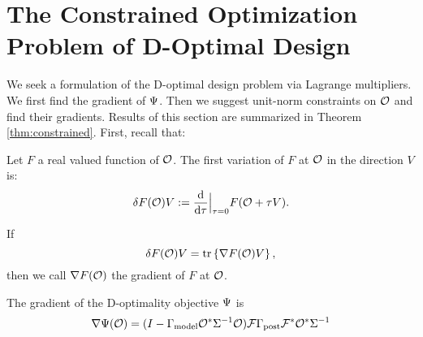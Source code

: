 \section{The Constrained Optimization Problem of D-Optimal Design}\label{section:D and grad}
We seek a formulation of the D-optimal design problem via Lagrange
multipliers. We first find the gradient of $\Psi$. Then we suggest
unit-norm constraints on $\mathcal{O}$ and find their gradients. Results of
this section are summarized in Theorem \ref{thm:constrained}. First,
recall that:
\begin{definition}\label{def:var}
  Let $F$ a real valued function of $\mathcal{O}$. The first variation of $F$
  at $\mathcal{O}$ in the direction $V$ is:
  \begin{equation*}
    \delta F(\obs) V := \frac{\der}{\der \tau}\Big |_{\tau=0}  F( \obs + \tau V).
  \end{equation*}

  If
  \begin{equation*}
    \delta F(\obs) V = \tr{\nabla F(\obs) V},
  \end{equation*}
  then we call $\nabla F(\mathcal{O})$ the gradient of $F$ at $\mathcal{O}$. 
\end{definition}




\begin{proposition}\label{prop:tar grad}
  The gradient of the D-optimality objective $\Psi$ is
  \begin{equation*}
    \nabla \tar(\obs) = ( I - \modcov \obs^* \Sigma^{-1}\obs ) \fwd
    \postcov \fwd^* \obs^* \Sigma^{-1}
  \end{equation*}
\end{proposition}

